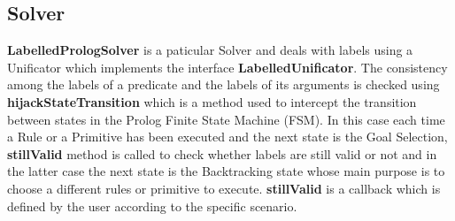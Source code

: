 \subsection{Solver}\label{subsec:solver}
\textbf{LabelledPrologSolver} is a paticular Solver and deals with labels using a Unificator which implements the
interface \textbf{LabelledUnificator}. The consistency among the labels of a predicate and the labels of its arguments is
checked using \textbf{hijackStateTransition} which is a method used to intercept the transition between states in the
Prolog Finite State Machine (FSM). In this case each time a Rule or a Primitive has been executed and the next state is
the Goal Selection, \textbf{stillValid} method is called to check whether labels are still valid or not and in the latter case
the next state is the Backtracking state whose main purpose is to choose a different rules or primitive to execute.\newline
\textbf{stillValid} is a callback which is defined by the user according to the specific scenario.